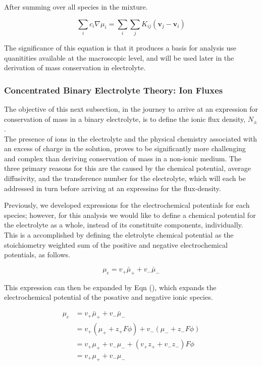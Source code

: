 \documentclass[lettersize,journal]{IEEEtran}
\begin{document}
After summing over all species in the mixture.

\begin{equation}\label{mulit_component_mixture_friction}
  \sum_{i} c_{i} \nabla \mu_{i}=\sum_{i} \sum_{j} K_{i j}\left(\mathbf{v}_{j}-\mathbf{v}_{i}\right)
\end{equation}

The significance of this equation is that it produces a basis for analysis use quanitities available at the macroscopic level, and will be used later in the derivation of mass conservation in electrolyte.\\

\subsubsection{Concentrated Binary Electrolyte Theory: Ion Fluxes}

The objective of this next subsection, in the journey to arrive at an expression for conservation of mass in a binary electrolyte, is to define the ionic flux density, $N_{\pm}$. \\

The presence of ions in the electrolyte and the physical chemistry associated with an excess of charge in the solution, proves to be significantly more challenging and complex than deriving conservation of mass in a non-ionic medium. The three primary reasons for this are the caused by the chemical potential, average diffusivity, and the transference number for the electrolyte, which will each be addressed in turn before arriving at an expressino for the flux-density.

Previously, we developed expressions for the electrochemical potentials for each species; however, for this analysis we would like to define a chemical potential for the electrolyte as a whole, instead of its constituite components, individually. This is a accomplished by defining the eletrolyte chemical potential as the stoichiometry weighted sum of the positive and negative electrochemical potentials, as follows.

\begin{equation}\label{electro_chem_potential}
\mu_{e}=v_{+} \bar{\mu}_{+}+v_{-} \bar{\mu}_{-}
\end{equation}

This expression can then be expanded by Eqn (), which expands the electrochemical potential of the posative and negative ionic species.


\begin{equation}
\begin{aligned}
\mu_{e} &=v_{+} \bar{\mu}_{+}+v_{-} \bar{\mu}_{-} \\
&=v_{+}\left(\mu_{+}+z_{+} F \phi\right)+v_{-}\left(\mu_{-}+z_{-} F \phi\right) \\
&=v_{+} \mu_{+}+v_{-} \mu_{-}+\left(v_{+} z_{+}+v_{-} z_{-}\right) F \phi \\
&=v_{+} \mu_{+}+v_{-} \mu_{-}
\end{aligned}
\end{equation}
\end{document}
